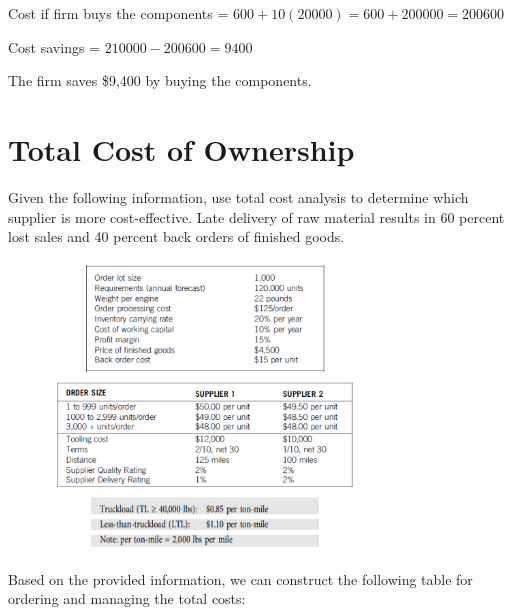 \documentclass[addpoints]{exam}
\begin{document}
\begin{sloppypar}
\begin{questions}
\begin{solution}
\begin{enumerate}
            Cost if firm buys the components = $ 600 + 10(20000) = 600 + 200000 = 200600 $

            Cost savings = $ 210000 - 200600 = 9400 $

            The firm saves \$9,400 by buying the components.
        \end{enumerate}
    \end{solution}
\end{questions}

\newpage
\section*{Total Cost of Ownership}
\begin{questions}
    \question Given the following information, use total cost analysis to determine which supplier is more cost-effective. Late delivery of raw material results in 60 percent lost sales and 40 percent back orders of finished goods.
    \begin{figure}[ht]
        \centering
        \includegraphics[width=0.75\textwidth]{img2.png}
    \end{figure}
    \begin{solution}
        Based on the provided information, we can construct the following table for ordering and managing the total costs:


\end{solution}
\end{questions}
\end{sloppypar}
\end{document}
